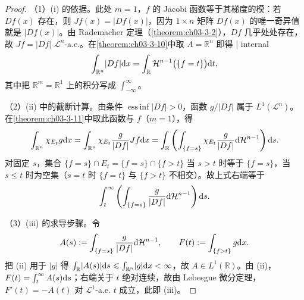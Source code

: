 \documentclass[../../main.tex]{subfiles}%
\begin{document}
\begin{proof}
（1）(i) 的依据。此处 $m=1$，$f$ 的 Jacobi 函数等于其梯度的模：若 $Df(x)$ 存在，则 $Jf(x)=\lvert Df(x)\rvert$，因为 $1\times n$ 矩阵 $Df(x)$ 的唯一奇异值就是 $\lvert Df(x)\rvert$。由 Rademacher 定理（\cref{theorem:ch03-3-2}），$Df$ 几乎处处存在，故 $Jf=\lvert Df\rvert$ $\mathcal{L}^n$-a.e.。在\cref{theorem:ch03-3-10}中取 $A=\mathbb{R}^n$ 即得 | internal %
\begin{align*}
\int_{\mathbb{R}^n}\lvert Df\rvert\mathrm{d} x=\int_{\mathbb{R}}\mathcal{H}^{n-1}\bigl(\{f=t\}\bigr)\mathrm{d} t,
\end{align*}
其中把 $\mathbb{R}^m=\mathbb{R}^1$ 上的积分写成 $\int_{-\infty}^{\infty}$。

（2）(ii) 中的截断计算。由条件 $\operatorname*{ess\,inf}\lvert Df\rvert>0$，函数 $g/\lvert Df\rvert$ 属于 $L^1(\mathcal{L}^n)$。在\cref{theorem:ch03-3-11}中取此函数与 $f$（$m=1$），得%
\begin{align*}
\int_{\mathbb{R}^n}\chi_{E_t}g\mathrm{d} x=\int_{\mathbb{R}^n}\chi_{E_t}\frac{g}{\lvert Df\rvert}Jf\mathrm{d} x=\int_{\mathbb{R}}\left(\int_{\{f=s\}}\chi_{E_t}\frac{g}{\lvert Df\rvert}\mathrm{d}\mathcal{H}^{n-1}\right)\mathrm{d} s.
\end{align*}
对固定 $s$，集合 $\{f=s\}\cap E_t=\{f=s\}\cap\{f>t\}$ 当 $s>t$ 时等于 $\{f=s\}$，当 $s\leqslant t$ 时为空集（$s=t$ 时 $\{f=t\}$ 与 $\{f>t\}$ 不相交）。故上式右端等于
\begin{align*}
\int_t^{\infty}\left(\int_{\{f=s\}}\frac{g}{\lvert Df\rvert}\mathrm{d}\mathcal{H}^{n-1}\right)\mathrm{d} s.
\end{align*}

（3）(iii) 的求导步骤。令
\begin{align*}
A(s):=\int_{\{f=s\}}\frac{g}{\lvert Df\rvert}\mathrm{d}\mathcal{H}^{n-1},\qquad F(t):=\int_{\{f>t\}}g\mathrm{d} x.
\end{align*}
把 (ii) 用于 $\lvert g\rvert$ 得 $\int_{\mathbb{R}}\lvert A(s)\rvert\mathrm{d} s\leqslant\int_{\mathbb{R}^n}\lvert g\rvert\mathrm{d} x<\infty$，故 $A\in L^1(\mathbb{R})$。由 (ii)，$F(t)=\int_t^{\infty}A(s)\mathrm{d} s$；右端关于 $t$ 绝对连续，故由 Lebesgue 微分定理，$F'(t)=-A(t)$ 对 $\mathcal{L}^1$-a.e. $t$ 成立，此即 (iii)。
\end{proof}
\end{document}
